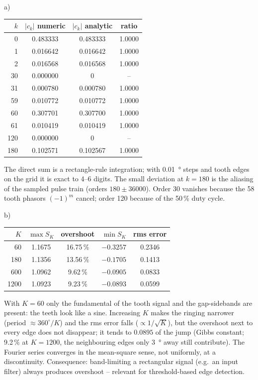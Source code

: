 \begin{solution}
a) 
\begin{center}\small
\begin{tabular}{@{}rccc@{}}\toprule
$k$ & $|c_k|$ numeric & $|c_k|$ analytic & ratio\\\midrule
0 & 0.483333 & 0.483333 & 1.0000\\
1 & 0.016642 & 0.016642 & 1.0000\\
2 & 0.016568 & 0.016568 & 1.0000\\
30 & 0.000000 & 0 & --\\
31 & 0.000780 & 0.000780 & 1.0000\\
59 & 0.010772 & 0.010772 & 1.0000\\
60 & 0.307701 & 0.307700 & 1.0000\\
61 & 0.010419 & 0.010419 & 1.0000\\
120 & 0.000000 & 0 & --\\
180 & 0.102571 & 0.102567 & 1.0000\\\bottomrule
\end{tabular}
\end{center}
The direct sum is a rectangle-rule integration; with \SI{0.01}{\degree} steps
and tooth edges on the grid it is exact to 4--6 digits. The small deviation at
$k=180$ is the aliasing of the sampled pulse train (orders $180\pm36000$).
Order 30 vanishes because the 58 tooth phasors $(-1)^m$ cancel; order 120
because of the 50\,\% duty cycle.

b) 
\begin{center}\small
\begin{tabular}{@{}rcccc@{}}\toprule
$K$ & $\max S_K$ & overshoot & $\min S_K$ & rms error\\\midrule
60 & 1.1675 & 16.75\,\% & $-0.3257$ & 0.2346\\
180 & 1.1356 & 13.56\,\% & $-0.1705$ & 0.1413\\
600 & 1.0962 & 9.62\,\% & $-0.0905$ & 0.0833\\
1200 & 1.0923 & 9.23\,\% & $-0.0893$ & 0.0599\\\bottomrule
\end{tabular}
\end{center}
With $K=60$ only the fundamental of the tooth signal and the
gap-sidebands are present: the teeth look like a sine. Increasing $K$ makes
the ringing narrower (period $\approx360^\circ/K$) and the rms error falls
($\propto1/\sqrt K$), but the overshoot next to every edge does not
disappear; it tends to $0.0895$ of the jump (Gibbs constant; 9.2\,\% at
$K=1200$, the neighbouring edges only \SI{3}{\degree} away still contribute).
The Fourier series converges in the mean-square sense, not uniformly, at a
discontinuity. Consequence: band-limiting a rectangular signal (e.g.\ an
input filter) always produces overshoot -- relevant for threshold-based edge
detection.


\end{solution}
